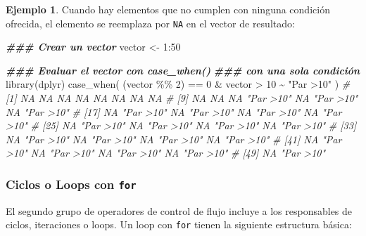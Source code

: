 \documentclass[
]{article}
\newenvironment{Shaded}{\begin{snugshade}}{\end{snugshade}}
\newcommand{\CommentTok}[1]{\textcolor[rgb]{0.56,0.35,0.01}{\textit{#1}}}
\newcommand{\DecValTok}[1]{\textcolor[rgb]{0.00,0.00,0.81}{#1}}
\newcommand{\DocumentationTok}[1]{\textcolor[rgb]{0.56,0.35,0.01}{\textbf{\textit{#1}}}}
\newcommand{\FunctionTok}[1]{\textcolor[rgb]{0.00,0.00,0.00}{#1}}
\newcommand{\NormalTok}[1]{#1}
\newcommand{\OtherTok}[1]{\textcolor[rgb]{0.56,0.35,0.01}{#1}}
\newcommand{\SpecialCharTok}[1]{\textcolor[rgb]{0.00,0.00,0.00}{#1}}
\newcommand{\StringTok}[1]{\textcolor[rgb]{0.31,0.60,0.02}{#1}}
\theoremstyle{definition}
\theoremstyle{definition}
\newtheorem{example}{Ejemplo}[section]
\theoremstyle{definition}
\theoremstyle{definition}
\theoremstyle{remark}
\begin{document}
\begin{example}
Cuando hay elementos que no cumplen con ninguna condición ofrecida, el elemento se reemplaza por \texttt{NA} en el vector de resultado:

\begin{Shaded}
\begin{Highlighting}[]
\DocumentationTok{\#\#\# Crear un vector}
\NormalTok{vector }\OtherTok{\textless{}{-}} \DecValTok{1}\SpecialCharTok{:}\DecValTok{50}

\DocumentationTok{\#\#\# Evaluar el vector con case\_when()}
\DocumentationTok{\#\#\# con una sola condición}
\FunctionTok{library}\NormalTok{(dplyr)}
\FunctionTok{case\_when}\NormalTok{(}
\NormalTok{  (vector }\SpecialCharTok{\%\%} \DecValTok{2}\NormalTok{) }\SpecialCharTok{==} \DecValTok{0} \SpecialCharTok{\&}\NormalTok{ vector }\SpecialCharTok{\textgreater{}} \DecValTok{10} \SpecialCharTok{\textasciitilde{}} \StringTok{"Par \textgreater{}10"}
\NormalTok{)}
\CommentTok{\#  [1] NA        NA        NA        NA        NA        NA        NA        NA       }
\CommentTok{\#  [9] NA        NA        NA        "Par \textgreater{}10" NA        "Par \textgreater{}10" NA        "Par \textgreater{}10"}
\CommentTok{\# [17] NA        "Par \textgreater{}10" NA        "Par \textgreater{}10" NA        "Par \textgreater{}10" NA        "Par \textgreater{}10"}
\CommentTok{\# [25] NA        "Par \textgreater{}10" NA        "Par \textgreater{}10" NA        "Par \textgreater{}10" NA        "Par \textgreater{}10"}
\CommentTok{\# [33] NA        "Par \textgreater{}10" NA        "Par \textgreater{}10" NA        "Par \textgreater{}10" NA        "Par \textgreater{}10"}
\CommentTok{\# [41] NA        "Par \textgreater{}10" NA        "Par \textgreater{}10" NA        "Par \textgreater{}10" NA        "Par \textgreater{}10"}
\CommentTok{\# [49] NA        "Par \textgreater{}10"}
\end{Highlighting}
\end{Shaded}

\end{example}

\hypertarget{ciclos-o-loops-con-for}{%
\subsubsection{\texorpdfstring{Ciclos o Loops con \texttt{for}}{Ciclos o Loops con for}}\label{ciclos-o-loops-con-for}}

El segundo grupo de operadores de control de flujo incluye a los responsables de ciclos, iteraciones o loops. Un loop con \texttt{for} tienen la siguiente estructura básica:
\end{document}
